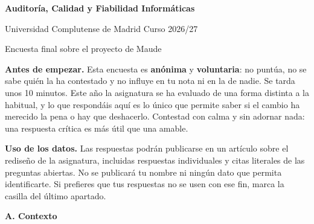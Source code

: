 

\usepackage{url}
\usepackage{hyperref}
\usepackage{array}
\usepackage{enumitem}

\newcommand{\cb}{\ding{113}}
\newcommand{\cbfive}{\cb & \cb & \cb & \cb & \cb}
\newcommand{\cbfour}{\cb & \cb & \cb & \cb}

\newcommand{\bloque}[1]{\bigskip\noindent\textbf{\large #1}\par\nobreak\smallskip}



\begin{center}
{\Large\textbf{Auditor\'ia, Calidad y Fiabilidad Inform\'aticas}}
\smallskip

\large
Universidad Complutense de Madrid \qquad Curso 2026/27
\medskip

Encuesta final sobre el proyecto de Maude\hfill\mbox{}

\noindent\hrulefill
\end{center}

\noindent
\textbf{Antes de empezar.} Esta encuesta es \textbf{an\'onima} y
\textbf{voluntaria}: no puntúa, no se sabe qui\'en la ha contestado y no
influye en tu nota ni en la de nadie.
%
Se tarda unos 10 minutos.
%
Este a\~no la asignatura se ha evaluado de una forma distinta a la habitual, y
lo que respond\'ais aqu\'i es lo \'unico que permite saber si el cambio ha
merecido la pena o hay que deshacerlo. Contestad con calma y sin adornar
nada: una respuesta cr\'itica es m\'as \'util que una amable.

\smallskip
\noindent
\textbf{Uso de los datos.} Las respuestas podr\'an publicarse en un art\'iculo
sobre el rediseño de la asignatura, incluidas respuestas individuales y citas
literales de las preguntas abiertas. No se publicar\'a tu nombre ni ning\'un
dato que permita identificarte. Si prefieres que tus respuestas no se usen
con ese fin, marca la casilla del \'ultimo apartado.

\bloque{A. Contexto}

